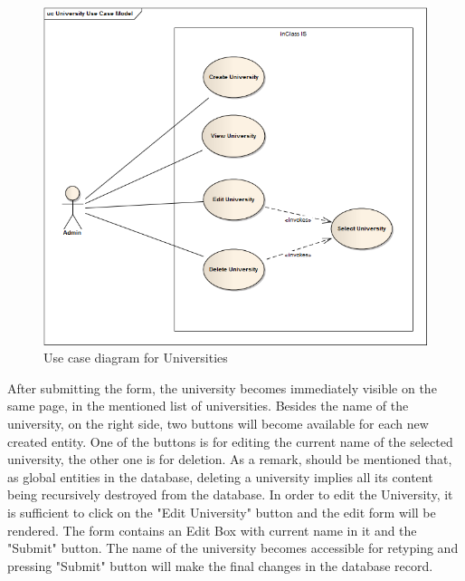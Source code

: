 \begin{figure}[H]
\centering
\includegraphics[width=14cm]{Chapter2/University_Use_Case_Model.png}
\caption{Use case diagram for Universities}
\label{fig:University_Use_Case_Model}
\end{figure}

After submitting the form, the university becomes immediately visible on the same page, in the mentioned list of universities. Besides the name of the university, on the right side, two buttons will become available for each new created entity. One of the buttons is for editing the current name of the selected university, the other one is for deletion. As a remark, should be mentioned that, as global entities in the database, deleting a university implies  all its content being recursively destroyed from the database. In order to edit the University, it is sufficient to click on the "Edit University" button and the edit form will be rendered. The form contains an Edit Box with current name in it and the "Submit" button. The name of the university becomes accessible for retyping and pressing "Submit" button will make the final changes in the database record.
\newpage

